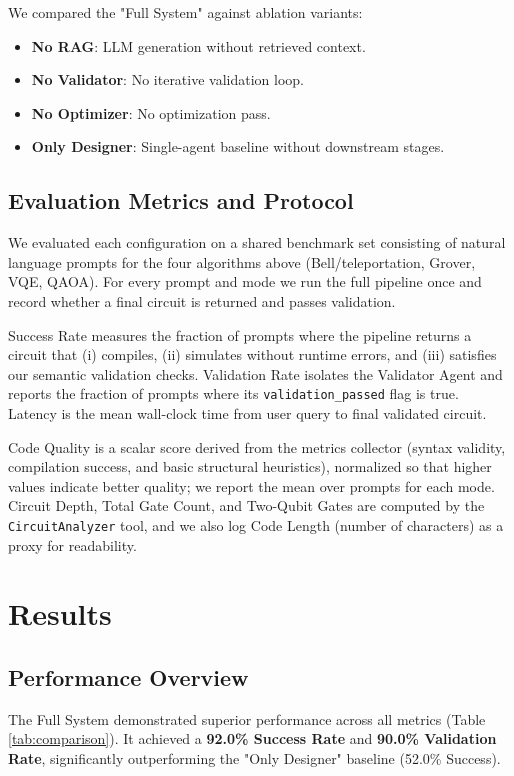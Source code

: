\documentclass[runningheads]{llncs}
\begin{document}
We compared the "Full System" against ablation variants:
\begin{itemize}
    \item \textbf{No RAG}: LLM generation without retrieved context.
    \item \textbf{No Validator}: No iterative validation loop.
    \item \textbf{No Optimizer}: No optimization pass.
    \item \textbf{Only Designer}: Single-agent baseline without downstream stages.
\end{itemize}

\subsection{Evaluation Metrics and Protocol}
We evaluated each configuration on a shared benchmark set consisting of natural language prompts for the four algorithms above (Bell/teleportation, Grover, VQE, QAOA). For every prompt and mode we run the full pipeline once and record whether a final circuit is returned and passes validation.

Success Rate measures the fraction of prompts where the pipeline returns a circuit that (i) compiles, (ii) simulates without runtime errors, and (iii) satisfies our semantic validation checks. Validation Rate isolates the Validator Agent and reports the fraction of prompts where its \texttt{validation\_passed} flag is true. Latency is the mean wall-clock time from user query to final validated circuit.

Code Quality is a scalar score derived from the metrics collector (syntax validity, compilation success, and basic structural heuristics), normalized so that higher values indicate better quality; we report the mean over prompts for each mode. Circuit Depth, Total Gate Count, and Two-Qubit Gates are computed by the \texttt{CircuitAnalyzer} tool, and we also log Code Length (number of characters) as a proxy for readability.

\section{Results}

\subsection{Performance Overview}
The Full System demonstrated superior performance across all metrics (Table \ref{tab:comparison}). It achieved a \textbf{92.0\% Success Rate} and \textbf{90.0\% Validation Rate}, significantly outperforming the "Only Designer" baseline (52.0\% Success).
\end{document}

